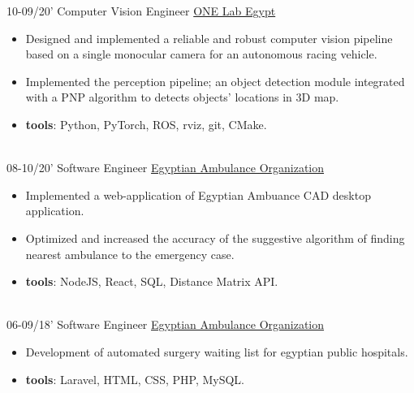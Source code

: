 \documentclass[a4paper]{twentysecondcv} %
\begin{document}
\begin{twenty} %

  \twentyitem
  {10-09/20'}
{}
    {Computer Vision Engineer}
    {\href{https://onelab-eg.com/}{ONE Lab Egypt}}
    {}
    {\vspace{-2mm}\begin{itemize}[topsep=0pt,partopsep=0pt]
    \item  Designed and implemented a reliable and robust computer vision pipeline based on a single monocular camera for an autonomous racing vehicle.
    \item  Implemented the perception pipeline; an object detection module integrated with a PNP algorithm to detects objects' locations in 3D map.
    \item \textbf{tools}: Python, PyTorch, ROS, rviz, git, CMake.
    \end{itemize}} \\

  \twentyitem
  {08-10/20'}
{}
    {Software Engineer}
    {\href{http://www.eao.gov.eg/English/Pages/default.aspx/}{Egyptian Ambulance Organization}}
    {}
    {\vspace{-2mm}\begin{itemize}[topsep=0pt,partopsep=0pt]
    \item Implemented a web-application of Egyptian Ambuance CAD desktop application.
    \item Optimized and increased the accuracy of the suggestive algorithm of finding nearest ambulance to the emergency case.
    \item \textbf{tools}: NodeJS, React, SQL, Distance Matrix API.
    \end{itemize}} \\

  \twentyitem
  {06-09/18'}
{}
    {Software Engineer}
    {\href{http://www.eao.gov.eg/English/Pages/default.aspx/}{Egyptian Ambulance Organization}}
    {}
    {\vspace{-2mm}\begin{itemize}[topsep=0pt,partopsep=0pt]
    \item Development of automated surgery waiting list for egyptian public hospitals.
    \item \textbf{tools}: Laravel, HTML, CSS, PHP, MySQL.
    \end{itemize}} \\


		

        
\end{twenty}
\end{document}

